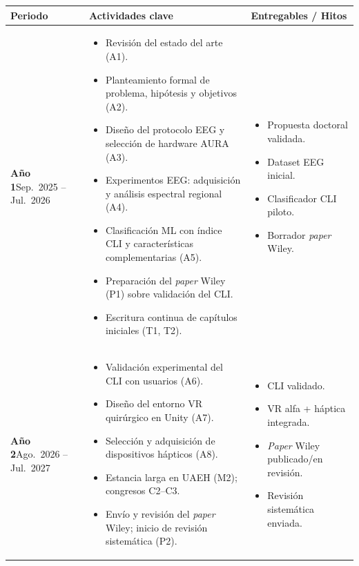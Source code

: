 \documentclass[12pt]{article}
\begin{document}
\begingroup\sloppy
\begin{tabularx}{\textwidth}{|>{\raggedright\arraybackslash}p{3.0cm}|>{\raggedright\arraybackslash}X|>{\raggedright\arraybackslash}p{3.8cm}|}
\hline
\rowcolor{gray!30}
\textbf{Periodo} & \textbf{Actividades clave} & \textbf{Entregables / Hitos} \\
\hline

\textbf{Año 1}\newline Sep.\ 2025 --\newline Jul.\ 2026 &
\begin{itemize}
  \item Revisión del estado del arte (A1).
  \item Planteamiento formal de problema, hipótesis y objetivos (A2).
  \item Diseño del protocolo EEG y selección de hardware AURA (A3).
  \item Experimentos EEG: adquisición y análisis espectral regional (A4).
  \item Clasificación ML con índice CLI y características complementarias (A5).
  \item Preparación del \textit{paper} Wiley (P1) sobre validación del CLI.
  \item Escritura continua de capítulos iniciales (T1, T2).
\end{itemize}
&
\begin{itemize}
  \item Propuesta doctoral validada.
  \item Dataset EEG inicial.
  \item Clasificador CLI piloto.
  \item Borrador \textit{paper} Wiley.
\end{itemize} \\

\hline
\textbf{Año 2}\newline Ago.\ 2026 --\newline Jul.\ 2027 &
\begin{itemize}
  \item Validación experimental del CLI con usuarios (A6).
  \item Diseño del entorno VR quirúrgico en Unity (A7).
  \item Selección y adquisición de dispositivos hápticos (A8).
  \item Estancia larga en UAEH (M2); congresos C2--C3.
  \item Envío y revisión del \textit{paper} Wiley; inicio de revisión sistemática (P2).
\end{itemize}
&
\begin{itemize}
  \item CLI validado.
  \item VR alfa + háptica integrada.
  \item \textit{Paper} Wiley publicado/en revisión.
  \item Revisión sistemática enviada.
\end{itemize} \\


\end{tabularx}
\end{document}
